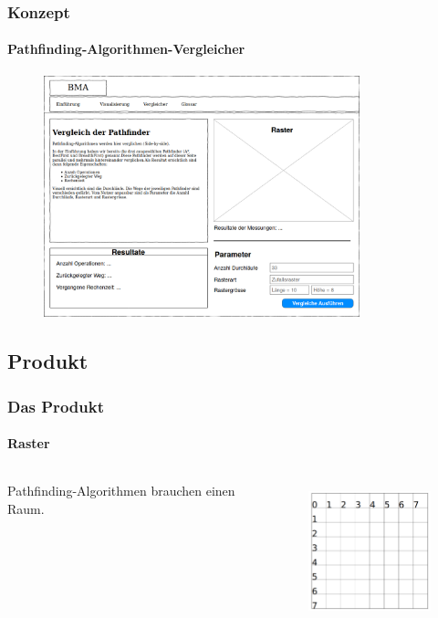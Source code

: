 \documentclass[professionalfont,serif,german]{beamer}
\begin{document}
\begin{frame}
  \frametitle{Konzept}
  \framesubtitle{Pathfinding-Algorithmen-Vergleicher}
  \begin{figure}
    \includegraphics[height=7cm]{img/konzept1.png}
  \end{figure}
\end{frame}

\begin{frame}
  \section{Produkt}
  \frametitle{Das Produkt}
  \framesubtitle{Raster}
    \begin{columns}
      \begin{column}[T]{0.5\textwidth}
        Pathfinding-Algorithmen brauchen einen Raum.
      \end{column}
      \begin{column}[T]{0.5\textwidth}
        \begin{figure}
          \includegraphics[height=4cm]{img/grid1.png}
        \end{figure}
      \end{column}
    \end{columns}
\end{frame}
\end{document}
